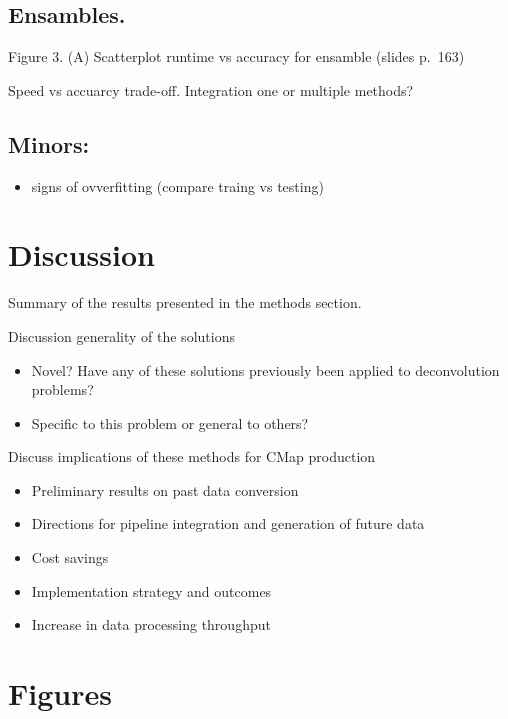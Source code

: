 \documentclass[]{article}
\providecommand{\tightlist}{%
  \setlength{\itemsep}{0pt}\setlength{\parskip}{0pt}}
\begin{document}
\hypertarget{ensambles.}{%
\subsection{Ensambles.}\label{ensambles.}}

Figure 3. (A) Scatterplot runtime vs accuracy for ensamble (slides
p.~163)

Speed vs accuarcy trade-off. Integration one or multiple methods?

\hypertarget{minors}{%
\subsection{Minors:}\label{minors}}

\begin{itemize}
\tightlist
\item
  signs of ovverfitting (compare traing vs testing)
\end{itemize}

\hypertarget{discussion}{%
\section{Discussion}\label{discussion}}

Summary of the results presented in the methods section.

Discussion generality of the solutions

\begin{itemize}
\tightlist
\item
  Novel? Have any of these solutions previously been applied to
  deconvolution problems?
\item
  Specific to this problem or general to others?
\end{itemize}

Discuss implications of these methods for CMap production

\begin{itemize}
\tightlist
\item
  Preliminary results on past data conversion
\item
  Directions for pipeline integration and generation of future data
\item
  Cost savings
\item
  Implementation strategy and outcomes
\item
  Increase in data processing throughput
\end{itemize}

\hypertarget{figures}{%
\section{Figures}\label{figures}}
\end{document}
